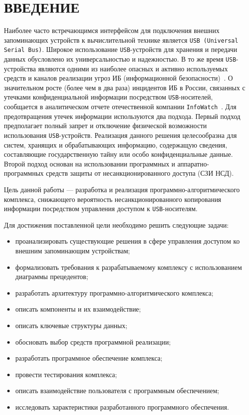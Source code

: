 \chapter*{ВВЕДЕНИЕ}

Наиболее часто встречающимся интерфейсом для подключения внешних запоминающих
устройств к вычислительной технике является \texttt{USB (Universal Serial Bus)}. 
Широкое использование \texttt{USB}-устройств для хранения и передачи данных 
обусловлено их универсальностью и надежностью. В то же время \texttt{USB}-устройства 
являются одними из наиболее опасных и активно используемых средств и каналов реализации 
угроз ИБ (информационной безопасности)~\cite{WhyUSB}. О значительном росте (более чем в два раза) 
инцидентов ИБ в России, связанных с утечками конфиденциальной информации посредством \texttt{USB}-носителей, 
сообщается в аналитическом отчете отечественной компании \texttt{InfoWatch}~\cite{InfoWatchAnalytics}.
Для предотвращения утечек информации используются два подхода. Первый подход предполагает полный 
запрет и отключение физической возможности использования \texttt{USB}-устройств. Реализация данного 
решения целесообразна для систем, хранящих и обрабатывающих информацию, содержащую сведения, составляющие 
государственную тайну или особо конфиденциальные данные. Второй подход основан на использовании программных 
и аппаратно-программных средств защиты от несанкционированного доступа (СЗИ НСД).

Цель данной работы --- разработка и реализация программно-алгоритмического
комплекса, снижающего вероятность несанкционированного копирования информации посредством управления доступом к \texttt{USB}-носителям. 

Для достижения поставленной цели необходимо решить следующие задачи:
\begin{itemize}[label=---]
    \item проанализировать существующие решения в сфере управления доступом ко внешним запоминающим устройствам;
    \item формализовать требования к разрабатываемому комплексу с использованием диаграммы прецедентов;
    \item разработать архитектуру программно-алгоритмического комплекса;
    \item описать компоненты и их взаимодействие;
    \item описать ключевые структуры данных;
    \item обосновать выбор средств программной реализации;
    \item разработать программное обеспечение комплекса;
    \item провести тестирования комплекса;
    \item описать взаимодействие пользователя с программным обеспечением;
    \item исследовать характеристики разработанного программного обеспечения.
\end{itemize}
